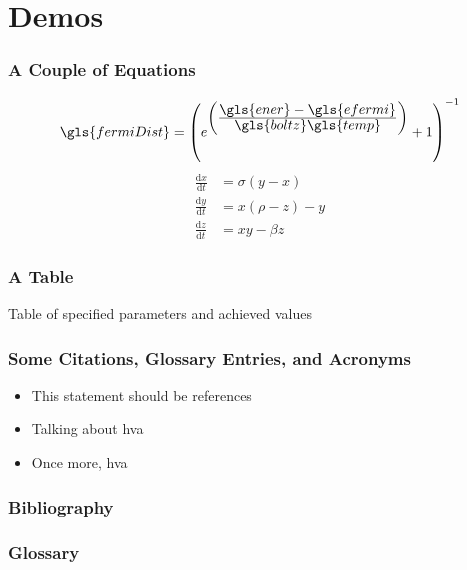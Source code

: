 \documentclass{beamer}
\newcommand\ddfrac[2]{\frac{\displaystyle #1}{\displaystyle #2}}
\begin{document}
    \section{Demos}
        \begin{frame}
            \frametitle{A Couple of Equations}
            \begin{equation}
                \gls{fermiDist} = \left(e^{\left(\ddfrac{\gls{ener}-\gls{efermi}}{\gls{boltz}\gls{temp}}\right)}+1\right)^{-1}
                \label{eqt:fermiDirac}
            \end{equation}
            \begin{align}
                \frac{\text{d}x}{\text{d}t} &= \sigma (y-x)\\
                \frac{\text{d}y}{\text{d}t} &= x(\rho -z)-y\\
                \frac{\text{d}z}{\text{d}t} &= xy-\beta z
            \end{align}
        \end{frame}
        \begin{frame}
            \frametitle{A Table}
            \begin{table}[H]
                \centering
                \caption{Table of specified parameters and achieved values}
                \vspace{0.1cm}
                \label{Table:Parameters}
            \end{table}
        \end{frame}
        \begin{frame}
            \frametitle{Some Citations, Glossary Entries, and Acronyms}
            \begin{itemize}
                \item This statement should be references \cite{acc:1}
                \item Talking about \gls{hva}
                \item Once more, \gls{hva}
            \end{itemize}
        \end{frame}
        \begin{frame}
            \frametitle{Bibliography}
            \printbibliography
        \end{frame}
        \begin{frame}
            \frametitle{Glossary}
            \printglossaries
        \end{frame}
\end{document}
